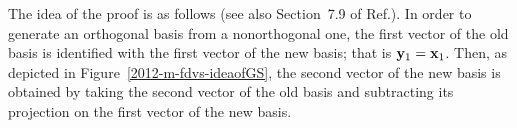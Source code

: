 {\color{OliveGreen}
\bproof
The idea of the proof is as follows (see also Section~7.9 of Ref.\cite{Greub75}).
In order to generate an orthogonal basis from a nonorthogonal one,
the first vector of the old basis is identified with the first vector of the new basis;
that is ${\bf y}_1={\bf x}_1$.
Then, as depicted in Figure~\ref{2012-m-fdvs-ideaofGS}, the second vector of the new basis is obtained by
taking the second vector of the old basis and
subtracting its projection on the first vector of the new basis.
\begin{marginfigure}%
{\color{black}
\begin{center}%
\end{center}}
\end{marginfigure}}

